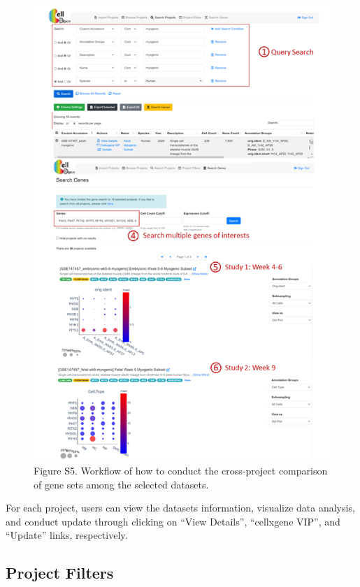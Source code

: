 \documentclass[
]{book}
\begin{document}
\begin{figure}
\centering
\includegraphics{figures/s7.png}
\caption{Figure S5. Workflow of how to conduct the cross-project comparison of gene sets among the selected datasets.}
\end{figure}

For each project, users can view the datasets information, visualize data analysis, and conduct update through clicking on ``View Details'', ``cellxgene VIP'', and ``Update'' links, respectively.

\hypertarget{project-filters}{%
\subsection{Project Filters}\label{project-filters}}
\end{document}
